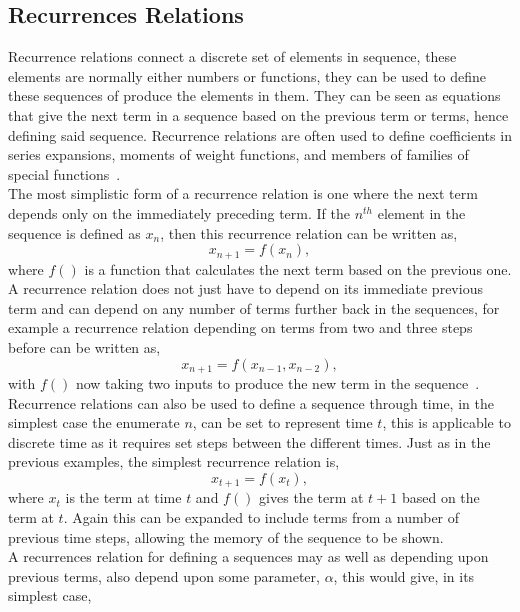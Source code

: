 \documentclass{article}
\begin{document}
\subsection{Recurrences Relations} 
Recurrence relations connect a discrete set of elements in sequence, these elements are normally either numbers or functions, they can be used to define these sequences of produce the elements in them. They can be seen as equations that give the next term in a sequence based on the previous term or terms, hence defining said sequence. Recurrence relations are often used to define coefficients in series expansions, moments of weight functions, and members of families of special functions~\cite{recurrelationbook}.\\
The most simplistic form of a recurrence relation is one where the next term depends only on the immediately preceding term. If the $n^{th}$ element in the sequence is defined as  $x_{n}$, then this recurrence relation can be written as,    
\begin{equation}
x_{n+1} = f(x_{n}),
\end{equation}
where $f()$ is a function that calculates the next term based on the previous one. A recurrence relation does not just have to depend on its immediate previous term and can depend on any number of terms further back in the sequences, for example a recurrence relation depending on terms from two and three steps before can be written as, 
\begin{equation}
x_{n+1} = f(x_{n-1}, x_{n-2}),
\end{equation}
with $f()$ now taking two inputs to produce the new term in the sequence~\cite{recurrealtionwebpage}.\\
Recurrence relations can also be used to define a sequence through time, in the simplest case the enumerate $n$, can be set to represent time $t$, this is applicable to discrete time as it requires set steps between the different times. Just as in the previous examples, the simplest recurrence relation is,  
\begin{equation}
x_{t+1} = f(x_{t}),
\end{equation}
where $x_{t}$ is the term at time $t$ and $f()$ gives the term at $t+1$ based on the term at $t$. Again this can be expanded to include terms from a number of previous time steps, allowing the memory of the sequence to be shown.\\  
A recurrences relation for defining a sequences may as well as depending upon previous terms, also depend upon some parameter, $\alpha$, this would give, in its simplest case, 
\end{document}
